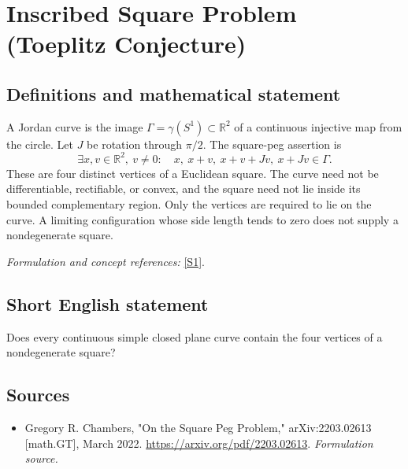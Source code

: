 \documentclass[11pt]{article}
\begin{document}
\section*{\texorpdfstring{Inscribed Square Problem (Toeplitz Conjecture)}{Inscribed Square Problem (Toeplitz Conjecture)}}\label{statement}
\subsection{Definitions and mathematical statement}
A Jordan curve is the image $\Gamma=\gamma(S^1)\subset{\mathbb{R}}^2$ of a continuous injective map from the circle. Let $J$ be rotation through $\pi/2$. The square-peg assertion is
\[
 \exists x,v\in{\mathbb{R}}^2,\ v\ne0:\quad
 x,\ x+v,\ x+v+Jv,\ x+Jv\in\Gamma.
\]
These are four distinct vertices of a Euclidean square. The curve need not be differentiable, rectifiable, or convex, and the square need not lie inside its bounded complementary region. Only the vertices are required to lie on the curve. A limiting configuration whose side length tends to zero does not supply a nondegenerate square.
\par\smallskip\textit{Formulation and concept references:} \href{https://arxiv.org/pdf/2203.02613}{[S1]}.

\subsection{Short English statement}
Does every continuous simple closed plane curve contain the four vertices of a nondegenerate square?
\subsection{Sources}
\begin{itemize}
\item[S1]Gregory R. Chambers, "On the Square Peg Problem," arXiv:2203.02613 [math.GT], March 2022.
\url{https://arxiv.org/pdf/2203.02613}.
\textit{Formulation source.}
\end{itemize}
\end{document}
